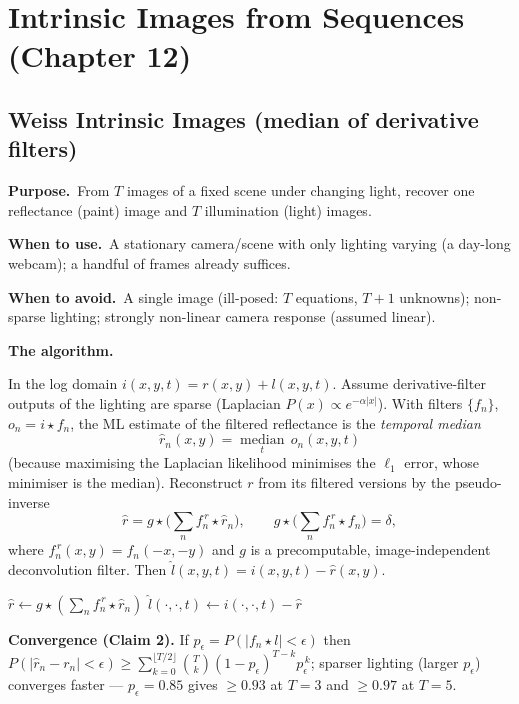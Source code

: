 \documentclass[10pt]{article}
\newcommand{\Purpose}{\par\smallskip\textbf{Purpose.}\ }
\newcommand{\WhenUse}{\par\textbf{When to use.}\ }
\newcommand{\WhenAvoid}{\par\textbf{When to avoid.}\ }
\newcommand{\TheAlgo}{\par\smallskip\textbf{The algorithm.}\par\nopagebreak}
\begin{document}
\newpage
\section{Intrinsic Images from Sequences (Chapter 12)}
\subsection{Weiss Intrinsic Images (median of derivative filters)}
\Purpose From $T$ images of a fixed scene under changing light, recover one reflectance (paint) image and
$T$ illumination (light) images.
\WhenUse A stationary camera/scene with only lighting varying (a day-long webcam); a handful of frames
already suffices.
\WhenAvoid A single image (ill-posed: $T$ equations, $T{+}1$ unknowns); non-sparse lighting; strongly
non-linear camera response (assumed linear).
\TheAlgo In the log domain $i(x,y,t)=r(x,y)+l(x,y,t)$. Assume derivative-filter outputs of the lighting are
sparse (Laplacian $P(x)\propto e^{-\alpha|x|}$). With filters $\{f_n\}$, $o_n=i\star f_n$, the ML estimate of
the filtered reflectance is the \emph{temporal median}
\[
\hat r_n(x,y)=\operatorname*{median}_t\,o_n(x,y,t)
\]
(because maximising the Laplacian likelihood minimises the $\ell_1$ error, whose minimiser is the median).
Reconstruct $r$ from its filtered versions by the pseudo-inverse
\[
\hat r=g\star\Big(\sum_n f_n^{\,r}\star\hat r_n\Big),\qquad
g\star\Big(\sum_n f_n^{\,r}\star f_n\Big)=\delta,
\]
where $f_n^{\,r}(x,y)=f_n(-x,-y)$ and $g$ is a precomputable, image-independent deconvolution filter. Then
$\hat l(x,y,t)=i(x,y,t)-\hat r(x,y)$.

\begin{algorithm}[H]
\SetAlgoLined
{}
$\hat r\leftarrow g\star(\sum_n f_n^{\,r}\star\hat r_n)$ 
$\hat l(\cdot,\cdot,t)\leftarrow i(\cdot,\cdot,t)-\hat r$\;
\caption{Weiss intrinsic-image estimation}
\end{algorithm}

\textbf{Convergence (Claim 2).} If $p_\epsilon=P(|f_n\star l|<\epsilon)$ then
$P(|\hat r_n-r_n|<\epsilon)\ge\sum_{k=0}^{\lfloor T/2\rfloor}\binom{T}{k}(1-p_\epsilon)^{T-k}p_\epsilon^{\,k}$;
sparser lighting (larger $p_\epsilon$) converges faster --- $p_\epsilon=0.85$ gives $\ge0.93$ at $T=3$ and
$\ge0.97$ at $T=5$.
\end{document}
